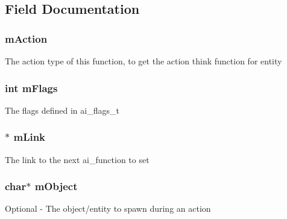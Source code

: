 \subsection{Field Documentation}
\subsubsection[{\texorpdfstring{m\+Action}{mAction}}]{ m\+Action}\hypertarget{structai__function__s_a99f128ebf8f9bb2be7e2ffaee33c5554}{}\label{structai__function__s_a99f128ebf8f9bb2be7e2ffaee33c5554}
The action type of this function, to get the action think function for entity 
\subsubsection[{\texorpdfstring{m\+Flags}{mFlags}}]{\setlength{\rightskip}{0pt plus 5cm}int m\+Flags}\hypertarget{structai__function__s_ab64996ddf8cd7006232fcb79bc296b03}{}\label{structai__function__s_ab64996ddf8cd7006232fcb79bc296b03}
The flags defined in ai\+\_\+flags\+\_\+t 
\subsubsection[{\texorpdfstring{m\+Link}{mLink}}]{$\ast$ m\+Link}\hypertarget{structai__function__s_a7965c244eab12a7cdc29c447b8c76dbc}{}\label{structai__function__s_a7965c244eab12a7cdc29c447b8c76dbc}
The link to the next ai\+\_\+function to set 
\subsubsection[{\texorpdfstring{m\+Object}{mObject}}]{\setlength{\rightskip}{0pt plus 5cm}char$\ast$ m\+Object}\hypertarget{structai__function__s_ad290bc1093389f523421449cfcab6a9c}{}\label{structai__function__s_ad290bc1093389f523421449cfcab6a9c}
Optional -\/ The object/entity to spawn during an action 
